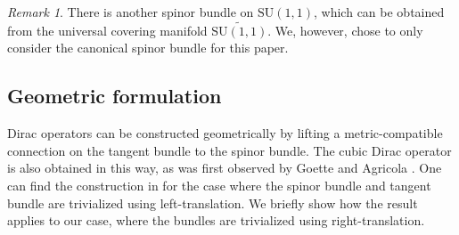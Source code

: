 \documentclass{amsart}
\theoremstyle{definition}
\theoremstyle{remark}
\newtheorem{remark}[theorem]{Remark}
\numberwithin{equation}{section}
\begin{document}
\begin{remark}
    There is another spinor bundle on $\mathrm{SU}(1,1)$, which can be obtained from the universal covering manifold $\widetilde{\mathrm{SU}(1,1)}$. We, however, chose to only consider the canonical spinor bundle for this paper.
\end{remark}

\subsection{Geometric formulation}
Dirac operators can be constructed geometrically by lifting a metric-compatible connection on the tangent bundle to the spinor bundle. The cubic Dirac operator is also obtained in this way, as was first observed by Goette \cite{goette_1999} and Agricola \cite{agricola_2003}. One can find the construction in \cite[Chapter 9]{meinrenken_2013} for the case where the spinor bundle and tangent bundle are trivialized using left-translation. We briefly show how the result applies to our case, where the bundles are trivialized using right-translation.
\end{document}
